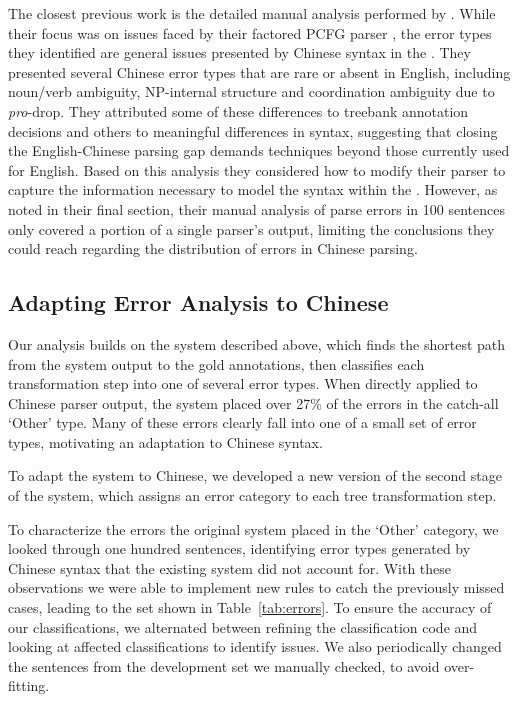 The closest previous work is the detailed manual analysis performed by \textcite{Levy-Manning:2003:ACL}.
While their focus was on issues faced by their factored PCFG parser \parencite{Klein-Manning:2003:NIPS}, the error types they identified are general issues presented by Chinese syntax in the \pctb.
They presented several Chinese error types that are rare or absent in English, including noun/verb ambiguity, NP-internal structure and coordination ambiguity due to \emph{pro}-drop.
They attributed some of these differences to treebank annotation decisions and others to meaningful differences in syntax, suggesting that closing the English-Chinese parsing gap demands techniques beyond those currently used for English.
Based on this analysis they considered how to modify their parser to capture the information necessary to model the syntax within the \pctb.
However, as noted in their final section, their manual analysis of parse errors in 100 sentences only covered a portion of a single parser's output, limiting the conclusions they could reach regarding the distribution of errors in Chinese parsing.

\subsection{Adapting Error Analysis to Chinese} \label{sec:adapting_automatic_error_analysis_to_chinese}

Our analysis builds on the system described above, which finds the shortest path from the system output to the gold annotations, then classifies each transformation step into one of several error types.
When directly applied to Chinese parser output, the system placed over 27\% of the errors in the catch-all `Other' type.
Many of these errors clearly fall into one of a small set of error types, motivating an adaptation to Chinese syntax.

To adapt the system to Chinese, we developed a new version of the second stage of the system, which assigns an error category to each tree transformation step.

To characterize the errors the original system placed in the `Other' category,
we looked through one hundred sentences, identifying error types generated by
Chinese syntax that the existing system did not account for.
With these observations we were able to implement new rules to catch the
previously missed cases, leading to the set shown in Table~\ref{tab:errors}.
To ensure the accuracy of our classifications, we alternated between refining
the classification code and looking at affected classifications to identify
issues.  We also periodically changed the sentences from the development set
we manually checked, to avoid over-fitting.

